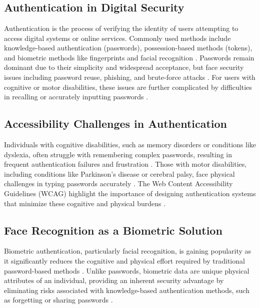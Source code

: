 \chapter{}%
\label{ch:stand-van-zaken}



\section{Authentication in Digital Security}
Authentication is the process of verifying the identity of users attempting to access digital systems or online services. 
Commonly used methods include knowledge-based authentication (passwords), possession-based methods (tokens), and 
biometric methods like fingerprints and facial recognition \autocite{Pant2022}. Passwords remain dominant due to 
their simplicity and widespread acceptance, but face security issues including password reuse, phishing, and 
brute-force attacks \autocite{Ophoff2021}. For users with cognitive or motor disabilities, these issues are 
further complicated by difficulties in recalling or accurately inputting passwords \autocite{Rochford2014}.

\section{Accessibility Challenges in Authentication}
Individuals with cognitive disabilities, such as memory disorders or conditions like dyslexia, often struggle with remembering complex passwords, resulting in frequent authentication failures and frustration \autocite{Farid2019, Ophoff2021}. Those with motor disabilities, including conditions like Parkinson's disease or cerebral palsy, face physical challenges in typing passwords accurately \autocite{Renaud2020}. The Web Content Accessibility Guidelines (WCAG) highlight the importance of designing authentication systems that minimize these cognitive and physical burdens \autocite{Brewer2023}.

\vspace{4\baselineskip}
\section{Face Recognition as a Biometric Solution}
Biometric authentication, particularly facial recognition, is gaining popularity as it significantly reduces the cognitive and physical effort required by traditional password-based methods \autocite{Furnell2022}. 
Unlike passwords, biometric data are unique physical attributes of an individual, providing an inherent security advantage by eliminating risks associated with knowledge-based authentication methods, 
such as forgetting or sharing passwords \autocite{Pant2022}.

